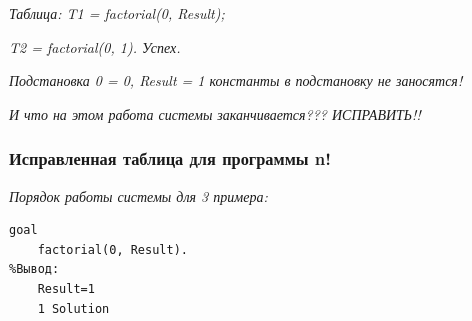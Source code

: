 \documentclass[a4paper,12pt]{article}
\begin{document}
	\textit{Таблица: T1 = factorial(0, Result);}
	
	\textit{T2 = factorial(0, 1). Успех.}
	
	\textit{Подстановка{ 0 = 0, Result = 1} константы в подстановку не заносятся!}
	
	\textit{И что на этом работа системы заканчивается???  ИСПРАВИТЬ!!}
	
	\subsubsection*{Исправленная таблица для программы n!}
	
	\textit{Порядок работы системы для 3 примера:}
	
	
	\begin{verbatim}
goal
	factorial(0, Result).
%Вывод:
	Result=1
	1 Solution
	\end{verbatim}
	
\end{document}
